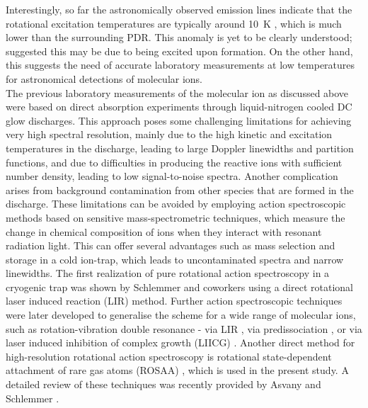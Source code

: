 Interestingly, so far the astronomically observed \co emission lines indicate that the rotational excitation temperatures are typically around 10~K \cite{Latter1993}, which is much lower than the surrounding PDR. This anomaly is yet to be clearly understood; \citet{Stauber2009} suggested this may be due to \co being excited upon formation. On the other hand, this suggests the need of  accurate laboratory measurements at low temperatures for astronomical detections of molecular ions. \\

The previous laboratory measurements of the \co molecular ion as discussed above were based on direct absorption experiments through liquid-nitrogen cooled DC glow discharges. This approach poses some challenging limitations for achieving very high spectral resolution, mainly due to the high kinetic and excitation temperatures in the discharge, leading to large Doppler linewidths and partition functions, and due to difficulties in producing the reactive ions with sufficient number density, leading to low signal-to-noise spectra. Another complication arises from background contamination from other species that are formed in the discharge. These limitations can be avoided by employing action spectroscopic methods based on sensitive  mass-spectrometric techniques, which measure the change in chemical composition of ions when they interact with resonant radiation light. This can offer several advantages such as mass selection and storage in a cold ion-trap, which leads to uncontaminated spectra and narrow linewidths. The first realization of pure rotational action spectroscopy in a cryogenic trap was shown by Schlemmer and coworkers \cite{Asvany2008} using a direct rotational laser induced reaction (LIR) method. Further action spectroscopic techniques were later developed to generalise the scheme for a  wide range of molecular ions, such as rotation-vibration double resonance - via LIR \cite{Gartner2013,jusko_two-photon_2014}, via predissociation \cite{Topfer2018}, or via laser induced inhibition of complex growth (LIICG)  \cite{Markus2019}. Another direct method for high-resolution rotational action spectroscopy is rotational state-dependent attachment of rare gas atoms (ROSAA) \cite{brunken_laboratory_2014,Brunken2017}, which is used in the present study. A detailed review of these techniques was recently provided by Asvany and Schlemmer \cite{Asvany2021}. \\

